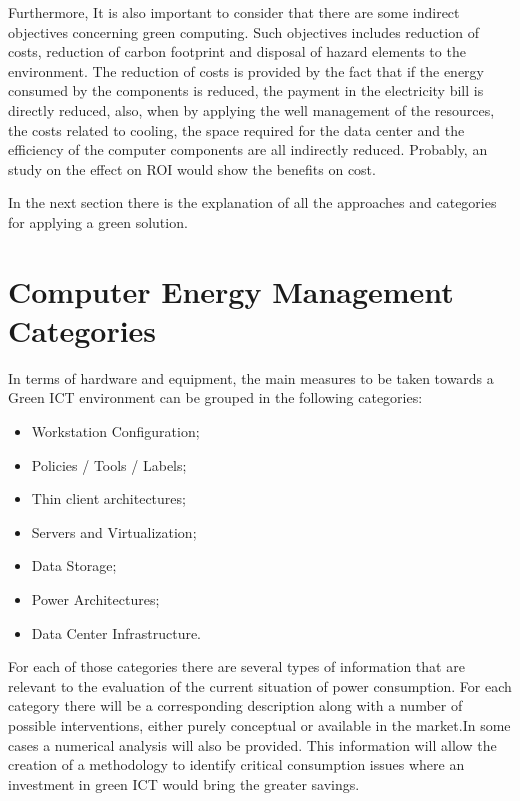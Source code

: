         Furthermore, It is also important to consider that there are some indirect objectives concerning green computing. Such objectives includes reduction of costs, reduction of carbon footprint and disposal of hazard elements to the environment. The reduction of costs is provided by the fact that if the energy consumed by the components is reduced, the payment in the electricity bill is directly reduced, also, when by applying the well management of the resources, the costs related to cooling, the space required for the data center and the efficiency of the computer components are all indirectly reduced. Probably, an study on the effect on ROI would show the benefits on cost.
    
        In the next section there is the explanation of all the approaches and categories for applying a green solution.
    
    \section{Computer Energy Management Categories} \label{sec2:energy_categories}
    In terms of hardware and equipment, the main measures to be taken towards a Green ICT environment can be grouped in the following categories:%
    \begin{itemize}
        \item Workstation Configuration;
        \item Policies / Tools / Labels;
        \item Thin client architectures;
        \item Servers and Virtualization;
        \item Data Storage;
        \item Power Architectures;
        \item Data Center Infrastructure.
    \end{itemize}
    
    For each of those categories there are several types of information that are relevant to the evaluation of the current situation of power consumption. For each category there will be a corresponding description along with a number of possible interventions, either purely conceptual or available in the market.In some cases a numerical analysis will also be provided. This information will allow the creation of a methodology to identify critical consumption issues where an investment in green ICT would bring the greater savings.
    
